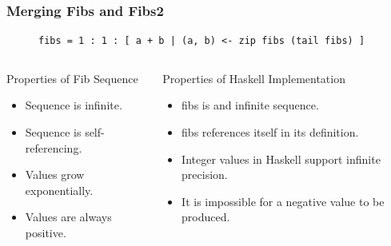 \documentclass{beamer}
\begin{document}
    \begin{frame}[fragile=singleslide]
        \frametitle{Merging Fibs and Fibs2}

        \begin{figure}
            \begin{lstlisting}
fibs = 1 : 1 : [ a + b | (a, b) <- zip fibs (tail fibs) ]
            \end{lstlisting}
        \end{figure}

        \begin{columns}[c]
            \begin{column}[T]{5cm}
                Properties of Fib Sequence
                \begin{itemize}
                    \item Sequence is infinite.
                    \item Sequence is self-referencing.
                    \item Values grow exponentially.
                    \item Values are always positive.
                \end{itemize}
            \end{column}
            \begin{column}[T]{5cm}
                Properties of Haskell Implementation
                \begin{itemize}
                    \item fibs is and infinite sequence.
                    \item fibs references itself in its definition.
                    \item Integer values in Haskell support infinite precision.
                    \item It is impossible for a negative value to be produced.
                \end{itemize}
            \end{column}
        \end{columns}
    \end{frame}
\end{document}
